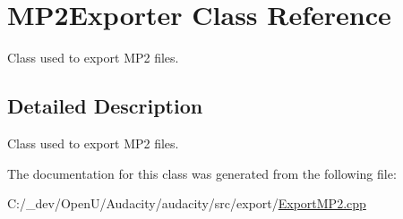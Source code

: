 \hypertarget{class_m_p2_exporter}{}\section{M\+P2\+Exporter Class Reference}
\label{class_m_p2_exporter}


Class used to export M\+P2 files.  




\subsection{Detailed Description}
Class used to export M\+P2 files. 

The documentation for this class was generated from the following file\+:\begin{DoxyCompactItemize}
\item 
C\+:/\+\_\+dev/\+Open\+U/\+Audacity/audacity/src/export/\hyperlink{_export_m_p2_8cpp}{Export\+M\+P2.\+cpp}\end{DoxyCompactItemize}
